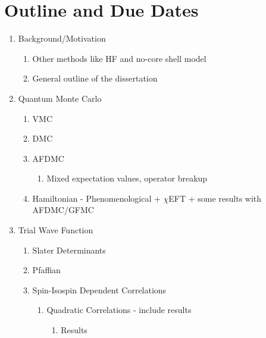 {\small
\section*{Outline and Due Dates}
\begin{enumerate}
   \item Background/Motivation 
   \begin{enumerate}
      \item Other methods like HF and no-core shell model
      \item General outline of the dissertation
   \end{enumerate}
   \item Quantum Monte Carlo 
   \begin{enumerate}
      \item VMC
      \item DMC
      \item AFDMC
      \begin{enumerate}
         \item Mixed expectation values, operator breakup
      \end{enumerate}
      \item Hamiltonian - Phenomenological + $\chi$EFT + some results with AFDMC/GFMC
   \end{enumerate}
   \item Trial Wave Function 
   \begin{enumerate}
      \item Slater Determinants
      \item Pfaffian
      \item Spin-Isospin Dependent Correlations
      \begin{enumerate}
         \item Quadratic Correlations - include results
         \begin{enumerate}
            \item Results
         \end{enumerate}

\end{enumerate}
\end{enumerate}
\end{enumerate}}
